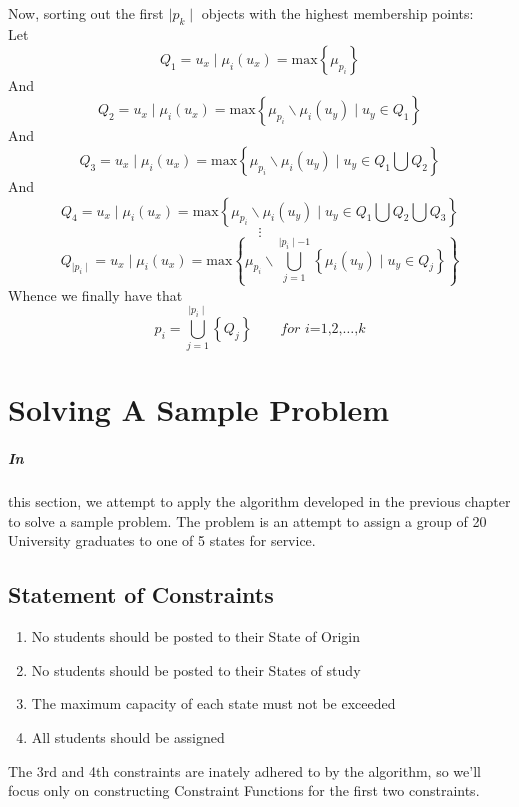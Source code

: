 \documentclass[a4paper,openany]{book}
\begin{document}
			\paragraph{}
				Now, sorting out the first $\mid p_k \mid$ objects with the highest membership points:\\
				Let
					\begin{equation}
						Q_1 = u_x \mid \mu_i(u_x) = \text{max}\left\{ \mu_{p_i} \right\}
					\end{equation}
				And
					\begin{equation}
						Q_2 = u_x \mid \mu_i(u_x) = \text{max}\left\{ \mu_{p_i} \backslash \mu_i(u_y) \mid u_y \in Q_1 \right\}
					\end{equation}
				And
					\begin{equation}
						Q_3 = u_x \mid \mu_i(u_x) = \text{max}\left\{ \mu_{p_i} \backslash \mu_i(u_y) \mid u_y \in Q_1 \bigcup Q_2 \right\}
					\end{equation}
				And
					\begin{equation}
						Q_4 = u_x \mid \mu_i(u_x) = \text{max}\left\{ \mu_{p_i} \backslash \mu_i(u_y) \mid u_y \in Q_1 \bigcup Q_2 \bigcup Q_3 \right\}
					\end{equation}
					\[
						\vdots
					\]
					\begin{equation}
						Q_{\mid p_i \mid} = u_x \mid \mu_i(u_x) = \text{max}\left\{ \mu_{p_i} \backslash \bigcup_{j=1}^{\mid p_i \mid - 1} \left\{  \mu_i(u_y) \mid u_y \in Q_j \right\} \right\}
					\end{equation}
				Whence we finally have that
					\begin{equation}
						p_i = \bigcup_{j=1}^{\mid p_i \mid}\left\{Q_j\right\} \qquad \textit{for i=1,2,}\dots\text{,}k
					\end{equation}
	\chapter{Solving A Sample Problem}
		\paragraph{In}
			this section, we attempt to apply the algorithm developed in the previous chapter to solve a sample problem. The problem is an attempt to assign a group of 20 University graduates to one of 5 states for service.
		
		\section{Statement of Constraints}
			\begin{enumerate}
				\item No students should be posted to their State of Origin
				\item No students should be posted to their States of study
				\item The maximum capacity of each state must not be exceeded
				\item All students should be assigned
			\end{enumerate}
			The 3rd and 4th constraints are inately adhered to by the algorithm, so we'll focus only on constructing Constraint Functions for the first two constraints.
\end{document}
